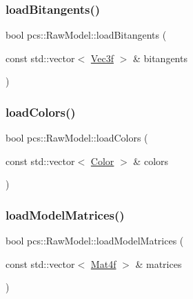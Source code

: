 \mbox{\label{classpcs_1_1RawModel_aa4798a4d19458fdb4aedeed0be9c02a1}} 
\subsubsection{\texorpdfstring{load\+Bitangents()}{loadBitangents()}}
{\footnotesize\ttfamily bool pcs\+::\+Raw\+Model\+::load\+Bitangents (\begin{DoxyParamCaption}\item[{const std\+::vector$<$ \hyperlink{namespacepcs_a68e0f517680976c17c810ffe6952cbab}{Vec3f} $>$ \&}]{bitangents }\end{DoxyParamCaption})}

\mbox{\label{classpcs_1_1RawModel_aae953c9150aae7571ac4d6eba5c33305}} 
\subsubsection{\texorpdfstring{load\+Colors()}{loadColors()}}
{\footnotesize\ttfamily bool pcs\+::\+Raw\+Model\+::load\+Colors (\begin{DoxyParamCaption}\item[{const std\+::vector$<$ \hyperlink{structpcs_1_1Color}{Color} $>$ \&}]{colors }\end{DoxyParamCaption})}

\mbox{\label{classpcs_1_1RawModel_adb1d28808d43a29209414e1b0ee56022}} 
\subsubsection{\texorpdfstring{load\+Model\+Matrices()}{loadModelMatrices()}}
{\footnotesize\ttfamily bool pcs\+::\+Raw\+Model\+::load\+Model\+Matrices (\begin{DoxyParamCaption}\item[{const std\+::vector$<$ \hyperlink{structpcs_1_1Mat4f}{Mat4f} $>$ \&}]{matrices }\end{DoxyParamCaption})}

